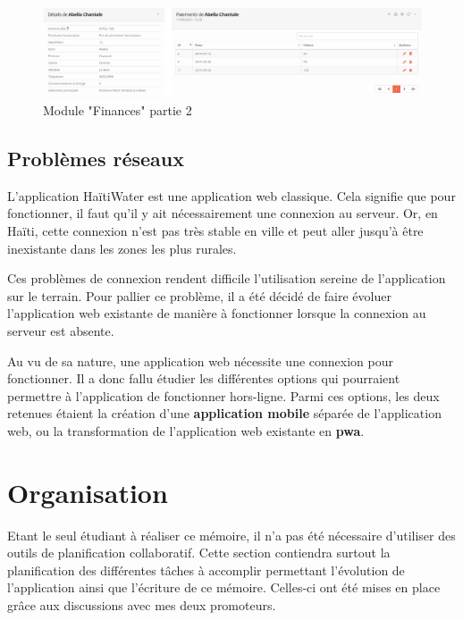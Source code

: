 \documentclass{EPL-master-thesis-covers-FR}
\begin{document}
				\begin{figure}[H]
					\centering
					\includegraphics[width=1\textwidth]{images/finances2}
					\caption{Module "Finances" partie 2}
					\label{fig:finance2}
				\end{figure}
				
				
		\section{Problèmes réseaux}
			L'application HaïtiWater est une application web classique. Cela signifie que pour fonctionner, il faut qu'il y ait nécessairement une connexion au serveur. Or, en Haïti, cette connexion n'est pas très stable en ville et peut aller jusqu'à être inexistante dans les zones les plus rurales. 
			
			Ces problèmes de connexion rendent difficile l'utilisation sereine de l'application sur le terrain. Pour pallier ce problème, il a été décidé de faire évoluer l'application web existante de manière à fonctionner lorsque la connexion au serveur est absente.
				
			Au vu de sa nature, une application web nécessite une connexion pour fonctionner. Il a donc fallu étudier les différentes options qui pourraient permettre à l'application de fonctionner hors-ligne. Parmi ces options,  les deux retenues étaient la création d'une \textbf{application mobile} séparée de l'application web, ou la transformation de l'application web existante en \textbf{\gls{pwa}}. 
				
			
			
			
		
			
			

	\chapter{Organisation}
		Etant le seul étudiant à réaliser ce mémoire, il n'a pas été nécessaire d'utiliser des outils de planification collaboratif. Cette section contiendra surtout la planification des différentes tâches à accomplir permettant l'évolution de l'application ainsi que l'écriture de ce mémoire. Celles-ci ont été mises en place grâce aux discussions avec mes deux promoteurs. 
\end{document}
